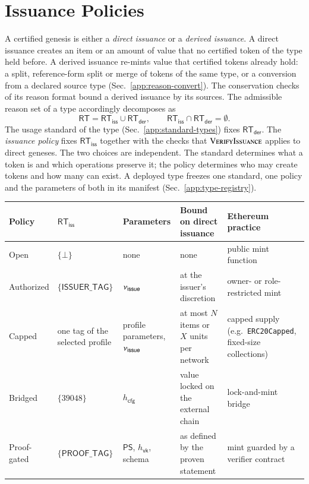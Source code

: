 \section{Issuance Policies}\label{app:issuance-policies}

A certified genesis is either a \emph{direct issuance} or a \emph{derived issuance}. A direct issuance creates an item or an amount of value that no certified token of the type held before. A derived issuance re-mints value that certified tokens already hold: a split, reference-form split or merge of tokens of the same type, or a conversion from a declared source type (Sec.~\ref{app:reason-convert}). The conservation checks of its reason format bound a derived issuance by its sources. The admissible reason set of a type accordingly decomposes as
\[
\mathsf{RT} = \mathsf{RT}_\mathsf{iss} \cup \mathsf{RT}_\mathsf{der},
\qquad
\mathsf{RT}_\mathsf{iss} \cap \mathsf{RT}_\mathsf{der} = \emptyset .
\]
The usage standard of the type (Sec.~\ref{app:standard-types}) fixes $\mathsf{RT}_\mathsf{der}$. The \emph{issuance policy} fixes $\mathsf{RT}_\mathsf{iss}$ together with the checks that $\Call{VerifyIssuance}{}$ applies to direct geneses. The two choices are independent. The standard determines what a token is and which operations preserve it; the policy determines who may create tokens and how many can exist. A deployed type freezes one standard, one policy and the parameters of both in its manifest (Sec.~\ref{app:type-registry}).

\begin{longtable}{>{\raggedright\arraybackslash}p{1.9cm}>{\raggedright\arraybackslash}p{2.8cm}>{\raggedright\arraybackslash}p{2.2cm}>{\raggedright\arraybackslash}p{3.0cm}>{\raggedright\arraybackslash}p{3.4cm}}
\textbf{Policy} & $\mathsf{RT}_\mathsf{iss}$ & \textbf{Parameters} & \textbf{Bound on direct issuance} & \textbf{Ethereum practice} \\
\hline
\endhead
Open & $\{\bot\}$ & none & none & public mint function \\
Authorized & $\{\mathsf{ISSUER\_TAG}\}$ & $\nu_\mathsf{issue}$ & at the issuer's discretion & owner- or role-restricted mint \\
Capped & one tag of the selected profile & profile parameters, $\nu_\mathsf{issue}$ & at most $N$ items or $X$ units per network & capped supply (e.g.\ \texttt{ERC20Capped}, fixed-size collections) \\
Bridged & $\{39048\}$ & $h_\mathsf{cfg}$ & value locked on the external chain & lock-and-mint bridge \\
Proof-gated & $\{\mathsf{PROOF\_TAG}\}$ & $\mathsf{PS}$, $h_\mathsf{vk}$, schema & as defined by the proven statement & mint guarded by a verifier contract \\
\end{longtable}

